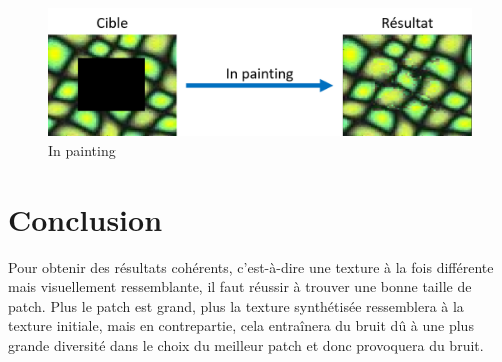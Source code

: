 \begin{figure}[!h]
\centering
\includegraphics[scale=0.6]{inpainting.png}
\caption{In painting}
\end{figure}

\newpage
\section{Conclusion}
Pour obtenir des résultats cohérents, c'est-à-dire une texture à la fois différente mais visuellement ressemblante, il faut réussir à trouver une bonne taille de patch. Plus le patch est grand, plus la texture synthétisée ressemblera à la texture initiale, mais en contrepartie, cela entraînera du bruit dû à une plus grande diversité dans le choix du meilleur patch et donc provoquera du bruit.\cite{inpainting} \cite{tsynthesis}




